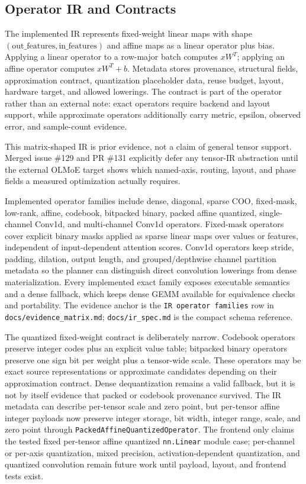 \documentclass[11pt]{article}
\begin{document}
\subsection{Operator IR and Contracts}

The implemented IR represents fixed-weight linear maps with shape
$(\mathrm{out\_features}, \mathrm{in\_features})$ and affine maps as a linear
operator plus bias. Applying a linear operator to a row-major batch computes
$xW^T$; applying an affine operator computes $xW^T + b$. Metadata stores
provenance, structural fields, approximation contract, quantization placeholder
data, reuse budget, layout, hardware target, and allowed lowerings. The
contract is part of the operator rather than an external note: exact operators
require backend and layout support, while approximate operators additionally
carry metric, epsilon, observed error, and sample-count evidence.

This matrix-shaped IR is prior evidence, not a claim of general tensor support.
Merged issue \#129 and PR \#131 explicitly defer any tensor-IR abstraction
until the external OLMoE target shows which named-axis, routing, layout, and
phase fields a measured optimization actually requires.

Implemented operator families include dense, diagonal, sparse COO, fixed-mask,
low-rank, affine, codebook, bitpacked binary, packed affine quantized,
single-channel Conv1d, and multi-channel Conv1d operators. Fixed-mask operators
cover explicit binary masks applied as sparse linear maps over values or
features, independent of input-dependent attention scores. Conv1d operators
keep stride, padding, dilation, output length, and grouped/depthwise channel
partition metadata so the planner can distinguish direct convolution lowerings
from dense materialization. Every
implemented exact family exposes executable semantics and a dense fallback,
which keeps dense GEMM available for equivalence checks and portability. The
evidence anchor is the \texttt{IR operator families} row in
\texttt{docs/evidence\_matrix.md}; \texttt{docs/ir\_spec.md} is the compact
schema reference.

The quantized fixed-weight contract is deliberately narrow. Codebook operators
preserve integer codes plus an explicit value table; bitpacked binary operators
preserve one sign bit per weight plus a tensor-wide scale. These operators may
be exact source representations or approximate candidates depending on their
approximation contract. Dense dequantization remains a valid fallback, but it
is not by itself evidence that packed or codebook provenance survived. The IR
metadata can describe per-tensor scale and zero point, but per-tensor affine
integer payloads now preserve integer storage, bit width, integer range, scale,
and zero point through \texttt{PackedAffineQuantizedOperator}. The frontend only
claims the tested fixed per-tensor affine quantized \texttt{nn.Linear} module
case; per-channel or per-axis quantization, mixed precision,
activation-dependent quantization, and quantized convolution remain future work
until payload, layout, and frontend tests exist.
\end{document}
